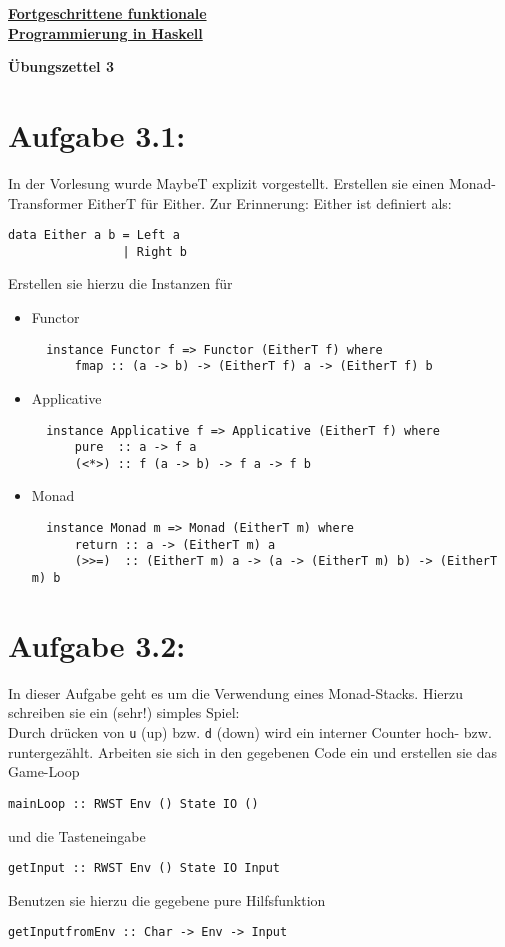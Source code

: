 \documentclass[a4paper,10pt]{scrartcl}
\newcommand{\underfat}[1]{\underline{\textbf{#1}}}
\newcommand{\theuebungszettel}{3}
\begin{document}
\begin{center}
  \begin{huge}
    \underfat{Fortgeschrittene funktionale}\\
    \underfat{Programmierung in Haskell}\\
  \end{huge}
\begin{LARGE}
\textbf{Übungszettel \theuebungszettel}
\end{LARGE}
\end{center}
\section*{Aufgabe \theuebungszettel.1:}
In der Vorlesung wurde MaybeT explizit vorgestellt. Erstellen sie einen Monad-Transformer EitherT für Either. Zur Erinnerung: Either ist definiert als:
\begin{verbatim}
data Either a b = Left a
                | Right b
\end{verbatim}
Erstellen sie hierzu die Instanzen für
\begin{itemize}
 \item Functor
       \begin{verbatim}
  instance Functor f => Functor (EitherT f) where
      fmap :: (a -> b) -> (EitherT f) a -> (EitherT f) b
       \end{verbatim}
 \item Applicative
       \begin{verbatim}
  instance Applicative f => Applicative (EitherT f) where
      pure  :: a -> f a
      (<*>) :: f (a -> b) -> f a -> f b
       \end{verbatim}
 \item Monad
       \begin{verbatim}
  instance Monad m => Monad (EitherT m) where
      return :: a -> (EitherT m) a
      (>>=)  :: (EitherT m) a -> (a -> (EitherT m) b) -> (EitherT m) b
       \end{verbatim}
\end{itemize}
\section*{Aufgabe \theuebungszettel.2:}
In dieser Aufgabe geht es um die Verwendung eines Monad-Stacks. Hierzu schreiben sie ein (sehr!) simples Spiel:\\
Durch drücken von \texttt{u} (up) bzw. \texttt{d} (down) wird ein interner Counter hoch- bzw. runtergezählt. Arbeiten sie sich in den gegebenen Code ein und erstellen sie das Game-Loop
\begin{verbatim}
mainLoop :: RWST Env () State IO ()
\end{verbatim}
und die Tasteneingabe
\begin{verbatim}
getInput :: RWST Env () State IO Input
\end{verbatim}
Benutzen sie hierzu die gegebene pure Hilfsfunktion
\begin{verbatim}
getInputfromEnv :: Char -> Env -> Input
\end{verbatim}
\end{document}
